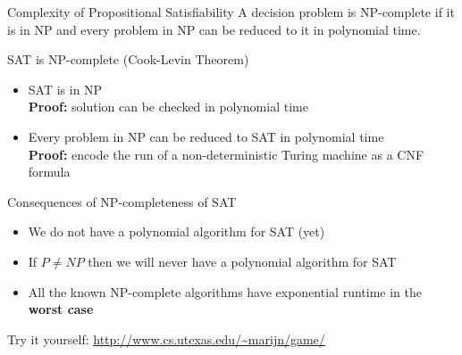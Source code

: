 \documentclass[t]{sdqbeamer}
\begin{document}
\begin{frame}{Complexity of Propositional Satisfiability}
\vspace*{-1em}
A decision problem is NP-complete if it is in NP and every problem in NP can be reduced to it in polynomial time.
\begin{block}{SAT is NP-complete (Cook-Levin Theorem)}
\begin{itemize}\setlength{\itemsep}{.5ex}
	\item SAT is in NP\\
	\textbf{Proof:} solution can be checked in polynomial time
	\item Every problem in NP can be reduced to SAT in polynomial time\\
	\textbf{Proof:} encode the run of a non-deterministic Turing machine as a CNF formula
\end{itemize}
\end{block}
\pause
\begin{block}{Consequences of NP-completeness of SAT}
\begin{itemize}
	\item We do not have a polynomial algorithm for SAT (yet) ~
	\item If $P \neq NP$ then we will never have a polynomial algorithm for SAT ~
	\item All the known NP-complete algorithms have exponential runtime in the \textbf{worst case} ~
\end{itemize}
\end{block}

\begin{example}[Hardness]
Try it yourself: \url{http://www.cs.utexas.edu/~marijn/game/}
\end{example}
\end{frame}
\end{document}

